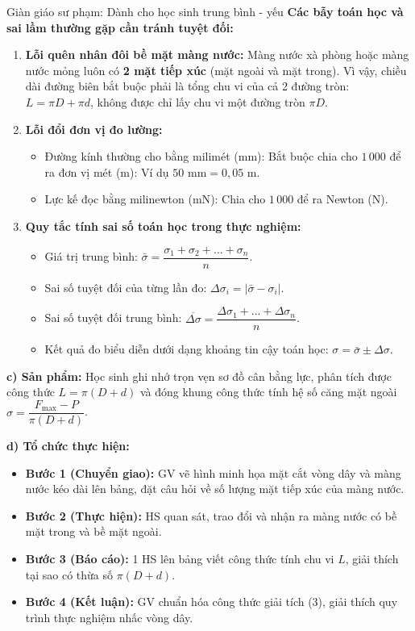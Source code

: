\documentclass[12pt, a4paper]{article}
\begin{document}
\begin{scaffoldbox}{Giàn giáo sư phạm: Dành cho học sinh trung bình - yếu}
    \textbf{Các bẫy toán học và sai lầm thường gặp cần tránh tuyệt đối:}
    \begin{enumerate}
        \item \textbf{Lỗi quên nhân đôi bề mặt màng nước:} Màng nước xà phòng hoặc màng nước mỏng luôn có \textbf{2 mặt tiếp xúc} (mặt ngoài và mặt trong). Vì vậy, chiều dài đường biên bắt buộc phải là tổng chu vi của cả 2 đường tròn: $L = \pi D + \pi d$, không được chỉ lấy chu vi một đường tròn $\pi D$.
        \item \textbf{Lỗi đổi đơn vị đo lường:}
        \begin{itemize}
            \item Đường kính thường cho bằng milimét ($\text{mm}$): Bắt buộc chia cho $1\,000$ để ra đơn vị mét ($\text{m}$): Ví dụ $50\text{ mm} = 0{,}05\text{ m}$.
            \item Lực kế đọc bằng milinewton ($\text{mN}$): Chia cho $1\,000$ để ra Newton ($\text{N}$).
        \end{itemize}
        \item \textbf{Quy tắc tính sai số toán học trong thực nghiệm:}
        \begin{itemize}
            \item Giá trị trung bình: $\bar{\sigma} = \dfrac{\sigma_1 + \sigma_2 + \dots + \sigma_n}{n}$.
            \item Sai số tuyệt đối của từng lần đo: $\Delta \sigma_i = |\bar{\sigma} - \sigma_i|$.
            \item Sai số tuyệt đối trung bình: $\overline{\Delta \sigma} = \dfrac{\Delta \sigma_1 + \dots + \Delta \sigma_n}{n}$.
            \item Kết quả đo biểu diễn dưới dạng khoảng tin cậy toán học: $\sigma = \bar{\sigma} \pm \Delta \sigma$.
        \end{itemize}
    \end{enumerate}
\end{scaffoldbox}

\noindent \textbf{c) Sản phẩm:}
Học sinh ghi nhớ trọn vẹn sơ đồ cân bằng lực, phân tích được công thức $L = \pi(D+d)$ và đóng khung công thức tính hệ số căng mặt ngoài $\sigma = \dfrac{F_{\text{max}} - P}{\pi(D+d)}$.

\noindent \textbf{d) Tổ chức thực hiện:}
\begin{itemize}
    \item \textbf{Bước 1 (Chuyển giao):} GV vẽ hình minh họa mặt cắt vòng dây và màng nước kéo dài lên bảng, đặt câu hỏi về số lượng mặt tiếp xúc của màng nước.
    \item \textbf{Bước 2 (Thực hiện):} HS quan sát, trao đổi và nhận ra màng nước có bề mặt trong và bề mặt ngoài.
    \item \textbf{Bước 3 (Báo cáo):} 1 HS lên bảng viết công thức tính chu vi $L$, giải thích tại sao có thừa số $\pi(D+d)$.
    \item \textbf{Bước 4 (Kết luận):} GV chuẩn hóa công thức giải tích (3), giải thích quy trình thực nghiệm nhấc vòng dây.
\end{itemize}
\end{document}
